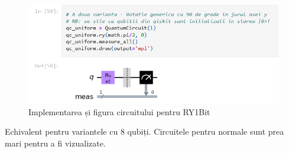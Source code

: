 \begin{figure}[H]
    \centering
    \includegraphics{anexe/figuri/CircuitRy1.png}
    \caption{Implementarea și figura circuitului pentru RY1Bit}
    \label{fig:CircuitHadamard8BitAnexa}
\end{figure}

Echivalent pentru variantele cu 8 qubiți.
Circuitele pentru normale sunt prea mari pentru a fi vizualizate.
